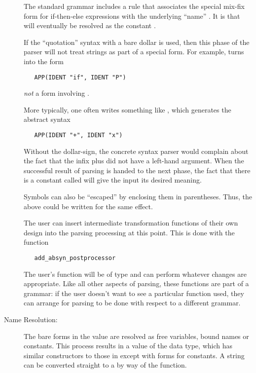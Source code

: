 \begin{description}
  The standard grammar includes a rule that associates the special
  mix-fix form for if-then-else expressions with the underlying
  ``name'' .  It is  that will eventually be
  resolved as the constant .

  If the ``quotation'' syntax with a bare dollar is used,%
%
%
%
%
then this phase of the parser will not treat strings as part of a
special form.  For example,  turns into
the  form
\begin{verbatim}
   APP(IDENT "if", IDENT "P")
\end{verbatim}
  \emph{not} a form involving .

  More typically, one often writes something like
  , which generates the abstract syntax
\begin{verbatim}
   APP(IDENT "+", IDENT "x")
\end{verbatim}
  Without the dollar-sign, the concrete syntax parser would complain
  about the fact that the infix plus did not have a left-hand
  argument.  When the successful result of parsing is handed to the
  next phase, the fact that there is a constant called \holtxt{+} will
  give the input its desired meaning.

  Symbols can also be ``escaped'' by enclosing them in parentheses.
  Thus, the above could be written  for the
  same effect.

  The user can insert intermediate transformation functions of their
  own design into the parsing processing at this point.  This is done
  with the function
\begin{verbatim}
   add_absyn_postprocessor
\end{verbatim}
  The user's function will be of type  and can
  perform whatever changes are appropriate.  Like all other aspects of
  parsing, these functions are part of a grammar: if the user doesn't
  want to see a particular function used, they can arrange for parsing
  to be done with respect to a different grammar.

\item[Name Resolution:] The bare  forms in the 
  value are resolved as free variables, bound names or constants.
  This process results in a value of the  data type, which
  has similar constructors to those in  except with forms
  for constants. %
  A string can be converted straight to a  by way of the
   function.


\end{description}
